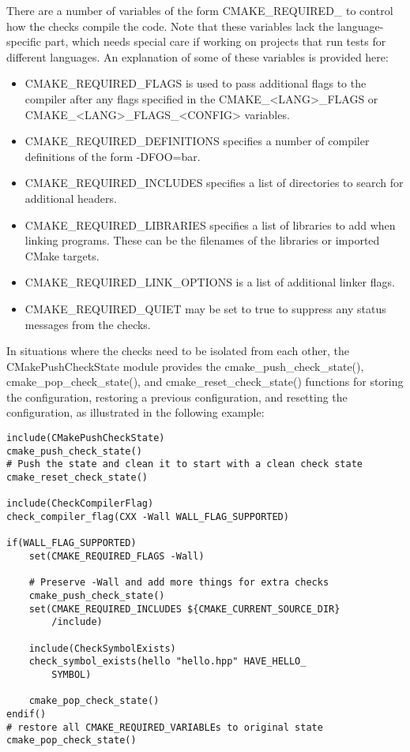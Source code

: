 There are a number of variables of the form CMAKE\_REQUIRED\_ to control how the checks compile the code. Note that these variables lack the language-specific part, which needs special care if working on projects that run tests for different languages. An explanation of some of these variables is provided here:

\begin{itemize}
\item 
CMAKE\_REQUIRED\_FLAGS is used to pass additional flags to the compiler after any flags specified in the CMAKE\_<LANG>\_FLAGS or CMAKE\_<LANG>\_FLAGS\_<CONFIG> variables.

\item 
CMAKE\_REQUIRED\_DEFINITIONS specifies a number of compiler definitions of the form -DFOO=bar.

\item 
CMAKE\_REQUIRED\_INCLUDES specifies a list of directories to search for additional headers.

\item 
CMAKE\_REQUIRED\_LIBRARIES specifies a list of libraries to add when linking programs. These can be the filenames of the libraries or imported CMake targets.

\item 
CMAKE\_REQUIRED\_LINK\_OPTIONS is a list of additional linker flags.

\item
CMAKE\_REQUIRED\_QUIET may be set to true to suppress any status messages from the checks.
\end{itemize}

In situations where the checks need to be isolated from each other, the CMakePushCheckState module provides the cmake\_push\_check\_state(), cmake\_pop\_check\_state(), and cmake\_reset\_check\_state() functions for storing the configuration, restoring a previous configuration, and resetting the configuration, as illustrated in the following example:

\begin{lstlisting}[style=styleCMake]
include(CMakePushCheckState)
cmake_push_check_state()
# Push the state and clean it to start with a clean check state
cmake_reset_check_state()

include(CheckCompilerFlag)
check_compiler_flag(CXX -Wall WALL_FLAG_SUPPORTED)

if(WALL_FLAG_SUPPORTED)
	set(CMAKE_REQUIRED_FLAGS -Wall)
	
	# Preserve -Wall and add more things for extra checks
	cmake_push_check_state()
	set(CMAKE_REQUIRED_INCLUDES ${CMAKE_CURRENT_SOURCE_DIR}
		/include)

	include(CheckSymbolExists)
	check_symbol_exists(hello "hello.hpp" HAVE_HELLO_
		SYMBOL)
	
	cmake_pop_check_state()
endif()
# restore all CMAKE_REQUIRED_VARIABLEs to original state
cmake_pop_check_state()
\end{lstlisting}

